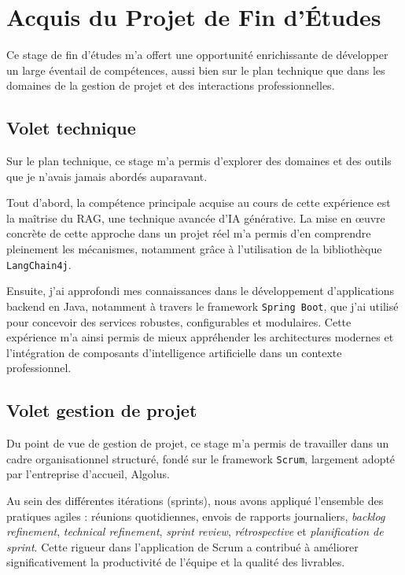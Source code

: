 \documentclass[12pt,a4paper]{report}
\begin{document}
	\chapter{Acquis du Projet de Fin d'Études}
	
	Ce stage de fin d'études m'a offert une opportunité enrichissante de développer un large éventail de compétences, aussi bien sur le plan technique que dans les domaines de la gestion de projet et des interactions professionnelles.
	
	\section{Volet technique}
	
	Sur le plan technique, ce stage m’a permis d’explorer des domaines et des outils que je n’avais jamais abordés auparavant.
	
	Tout d’abord, la compétence principale acquise au cours de cette expérience est la maîtrise du RAG, une technique avancée d’IA générative. La mise en œuvre concrète de cette approche dans un projet réel m’a permis d’en comprendre pleinement les mécanismes, notamment grâce à l’utilisation de la bibliothèque \texttt{LangChain4j}.
	
	Ensuite, j’ai approfondi mes connaissances dans le développement d’applications backend en Java, notamment à travers le framework \texttt{Spring Boot}, que j’ai utilisé pour concevoir des services robustes, configurables et modulaires. Cette expérience m’a ainsi permis de mieux appréhender les architectures modernes et l’intégration de composants d’intelligence artificielle dans un contexte professionnel.
	
	\section{Volet gestion de projet}
	
	Du point de vue de gestion de projet, ce stage m’a permis de travailler dans un cadre organisationnel structuré, fondé sur le framework \texttt{Scrum}, largement adopté par l’entreprise d’accueil, Algolus.
	
	Au sein des différentes itérations (sprints), nous avons appliqué l’ensemble des pratiques agiles : réunions quotidiennes, envois de rapports journaliers, \textit{backlog refinement}, \textit{technical refinement}, \textit{sprint review}, \textit{rétrospective} et \textit{planification de sprint}. Cette rigueur dans l’application de Scrum a contribué à améliorer significativement la productivité de l’équipe et la qualité des livrables.
	
\end{document}
